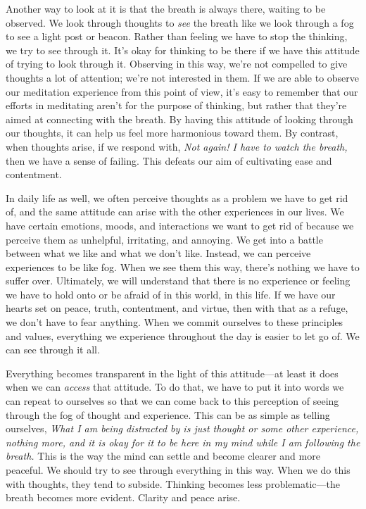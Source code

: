 Another way to look at it is that the breath is always there, waiting 
to be observed. We look through thoughts to \emph{see} the breath like 
we look through a fog to see a light post or beacon. Rather than 
feeling we have to stop the thinking, we try to see through it. It's 
okay for thinking to be there if we have this attitude of trying to 
look through it. Observing in this way, we're not compelled to give 
thoughts a lot of attention; we're not interested in them. If we are 
able to observe our meditation experience from this point of view, it's 
easy to remember that our efforts in meditating aren't for the purpose 
of thinking, but rather that they're aimed at connecting with the 
breath. By having this attitude of looking through our thoughts, it can 
help us feel more harmonious toward them. By contrast, when thoughts 
arise, if we respond with, \emph{Not again! I have to watch the 
breath,} then we have a sense of failing. This defeats our aim of 
cultivating ease and contentment.

In daily life as well, we often perceive thoughts as a problem we have 
to get rid of, and the same attitude can arise with the other 
experiences in our lives. We have certain emotions, moods, and 
interactions we want to get rid of because we perceive them as 
unhelpful, irritating, and annoying. We get into a battle between what 
we like and what we don't like. Instead, we can perceive experiences to 
be like fog. When we see them this way, there's nothing we have to 
suffer over. Ultimately, we will understand that there is no experience 
or feeling we have to hold onto or be afraid of in this world, in this 
life. If we have our hearts set on peace, truth, contentment, and 
virtue, then with that as a refuge, we don't have to fear anything. 
When we commit ourselves to these principles and values, everything we 
experience throughout the day is easier to let go of. We can see 
through it all.

Everything becomes transparent in the light of this attitude---at least 
it does when we can \emph{access} that attitude. To do that, we have to 
put it into words we can repeat to ourselves so that we can come back 
to this perception of seeing through the fog of thought and experience. 
This can be as simple as telling ourselves, \emph{What I am being 
distracted by is just thought or some other experience, nothing more, 
and it is okay for it to be here in my mind while I am following the 
breath.} This is the way the mind can settle and become clearer and 
more peaceful. We should try to see through everything in this way. 
When we do this with thoughts, they tend to subside. Thinking becomes 
less problematic---the breath becomes more evident. Clarity and peace 
arise.

